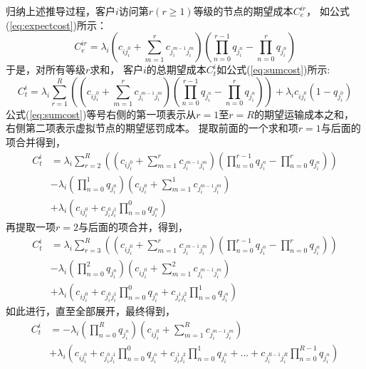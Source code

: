 归纳上述推导过程，客户$i$访问第$r(r\ge 1)$等级的节点的期望成本$C_e^{ir}$，
如公式(\ref{eq:expectcost})所示：
\begin{equation}
\label{eq:expectcost}
C_e^{ir}=\lambda_i 
\left( 
c_{ij_i^0}+ \sum_{m=1}^r c_{j_i^{m-1} j_i^{m}}
\right)
\left( 
\prod_{n=0}^{r-1} q_{j_i^n}-\prod_{n=0}^{r} q_{j_i^n}
\right)
\end{equation}
于是，对所有等级$r$求和，
客户$i$的总期望成本$C_t^i$如公式(\ref{eq:sumcost})所示:
\begin{equation}
\label{eq:sumcost}
C_t^i = \lambda_i \sum_{r=1}^R
\left( 
(c_{ij_i^0}+ \sum_{m=1}^r c_{j_i^{m-1} j_i^{m}})
(\prod_{n=0}^{r-1} q_{j_i^n}-\prod_{n=0}^{r} q_{j_i^n})
\right) +
\lambda_i c_{ij_i^0} (1-q_{j_i^0})
\end{equation}
公式(\ref{eq:sumcost})等号右侧的第一项表示从$r=1$至$r=R$的期望运输成本之和，
右侧第二项表示虚拟节点的期望惩罚成本。
提取前面的一个求和项$r=1$与后面的项合并得到，
\begin{equation}
\begin{aligned}
C_t^i &= \lambda_i \sum_{r=2}^R
\left( 
(c_{ij_i^0}+ \sum_{m=1}^r c_{j_i^{m-1} j_i^{m}})
(\prod_{n=0}^{r-1} q_{j_i^n}-\prod_{n=0}^{r} q_{j_i^n})
\right) \\
& - \lambda_i(\prod_{n=0}^1 q_{j_i^n})(c_{ij_i^0} + \sum_{m=1}^1 c_{j_i^{m-1}j_i^m})\\
& + \lambda_i(c_{ij_i^0} + c_{j_i^{0}j_i^{1}} \prod_{n=0}^0q_{j_i^n})
\end{aligned}
\end{equation}
再提取一项$r=2$与后面的项合并，得到，
\begin{equation}
\begin{aligned}
C_t^i &= \lambda_i \sum_{r=3}^R
\left( 
(c_{ij_i^0}+ \sum_{m=1}^r c_{j_i^{m-1} j_i^{m}})
(\prod_{n=0}^{r-1} q_{j_i^n}-\prod_{n=0}^{r} q_{j_i^n})
\right) \\
& - \lambda_i(\prod_{n=0}^2 q_{j_i^n})(c_{ij_i^0} + \sum_{m=1}^2 c_{j_i^{m-1}j_i^m})\\
& + \lambda_i(c_{ij_i^0} + c_{j_i^{0}j_i^{1}} \prod_{n=0}^0q_{j_i^n} + c_{j_i^{1}j_i^{2}} \prod_{n=0}^1q_{j_i^n})
\end{aligned}
\end{equation}
如此进行，直至全部展开，最终得到，
\begin{equation}
\label{eq:sumcostlast}
\begin{aligned}
C_t^i &= - \lambda_i(\prod_{n=0}^{R} q_{j_i^n})(c_{ij_i^0} + \sum_{m=1}^{R} c_{j_i^{m-1}j_i^m})\\
& + \lambda_i(c_{ij_i^0} + c_{j_i^{0}j_i^{1}} \prod_{n=0}^0q_{j_i^n} + 
 c_{j_i^{1}j_i^{2}} \prod_{n=0}^1q_{j_i^n} + ...
+ c_{j_i^{R-1}j_i^{R}} \prod_{n=0}^{R-1}q_{j_i^n})
\end{aligned}
\end{equation}
